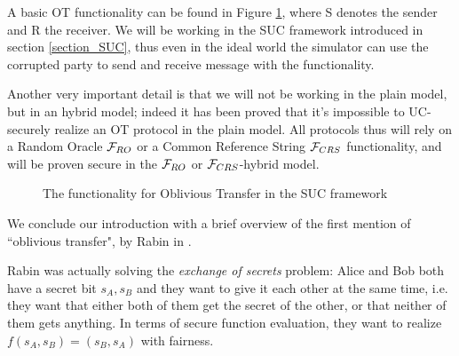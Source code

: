 A basic OT functionality can be found in Figure \ref{func_ot_base}, where S denotes the sender and R the receiver. We will be working in the SUC framework introduced in section \ref{section_SUC}, thus even in the ideal world the simulator can use the corrupted party to send and receive message with the functionality.

Another very important detail is that we will not be working in the plain model, but in an hybrid model; indeed it has been proved that it's impossible to UC-securely realize an OT protocol in the plain model. All protocols thus will rely on a Random Oracle $\mathcal{F}_{RO}$ or a Common Reference String $\mathcal{F}_{CRS}$ functionality, and will be proven secure in the $\mathcal{F}_{RO}$ or $\mathcal{F}_{CRS}$-hybrid model.

\begin{figure}
    \begin{center}
    \end{center}
    \caption{The functionality for Oblivious Transfer in the SUC framework}
    \label{func_ot_base}
\end{figure}

We conclude our introduction with a brief overview of the first mention of ``oblivious transfer", by Rabin in \cite{Rabin_OT}.

Rabin was actually solving the \emph{exchange of secrets} problem: Alice and Bob both have a secret bit $s_A,s_B$ and they want to give it each other at the same time, i.e. they want that either both of them get the secret of the other, or that neither of them gets anything. In terms of secure function evaluation, they want to realize $f(s_A,s_B)=(s_B,s_A)$ with fairness.

